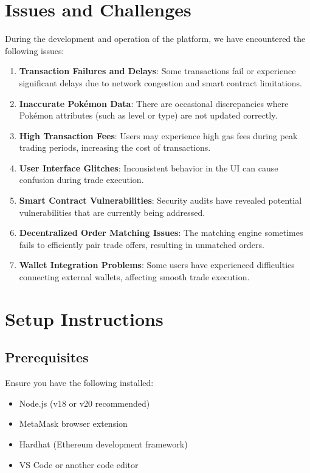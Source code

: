 \documentclass{article}
\begin{document}
\section{Issues and Challenges}
During the development and operation of the platform, we have encountered the following issues:
\begin{enumerate}
    \item \textbf{Transaction Failures and Delays}: Some transactions fail or experience significant delays due to network congestion and smart contract limitations.
    \item \textbf{Inaccurate Pokémon Data}: There are occasional discrepancies where Pokémon attributes (such as level or type) are not updated correctly.
    \item \textbf{High Transaction Fees}: Users may experience high gas fees during peak trading periods, increasing the cost of transactions.
    \item \textbf{User Interface Glitches}: Inconsistent behavior in the UI can cause confusion during trade execution.
    \item \textbf{Smart Contract Vulnerabilities}: Security audits have revealed potential vulnerabilities that are currently being addressed.
    \item \textbf{Decentralized Order Matching Issues}: The matching engine sometimes fails to efficiently pair trade offers, resulting in unmatched orders.
    \item \textbf{Wallet Integration Problems}: Some users have experienced difficulties connecting external wallets, affecting smooth trade execution.
\end{enumerate}

\section{Setup Instructions}
\subsection{Prerequisites}
Ensure you have the following installed:
\begin{itemize}
    \item Node.js (v18 or v20 recommended)
    \item MetaMask browser extension
    \item Hardhat (Ethereum development framework)
    \item VS Code or another code editor
\end{itemize}
\end{document}
